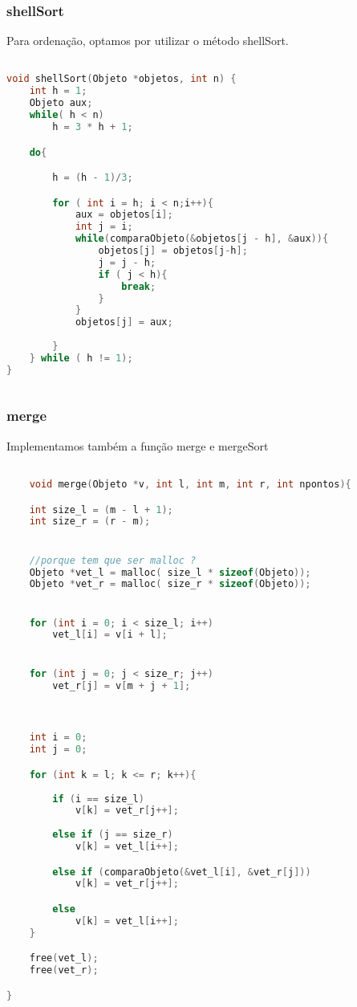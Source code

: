 \documentclass{article}
\begin{document}
\subsubsection{shellSort}

Para ordenação, optamos por utilizar o método shellSort.

\begin{lstlisting}[caption={Função shellSort},label={lst:cod7},language=C]

void shellSort(Objeto *objetos, int n) {
    int h = 1;
    Objeto aux;
    while( h < n)
        h = 3 * h + 1;

    do{

        h = (h - 1)/3;

        for ( int i = h; i < n;i++){
            aux = objetos[i]; 
            int j = i;
            while(comparaObjeto(&objetos[j - h], &aux)){
                objetos[j] = objetos[j-h];
                j = j - h;
                if ( j < h){
                    break;
                }
            }
            objetos[j] = aux;
            
        }
    } while ( h != 1); 
}
    
\end{lstlisting}

\subsubsection{merge}

Implementamos também a função merge e mergeSort

\begin{lstlisting}[caption={Função merge},label={lst:cod7},language=C]

    void merge(Objeto *v, int l, int m, int r, int npontos){

    int size_l = (m - l + 1);
    int size_r = (r - m);


    //porque tem que ser malloc ?
    Objeto *vet_l = malloc( size_l * sizeof(Objeto));
    Objeto *vet_r = malloc( size_r * sizeof(Objeto));


    for (int i = 0; i < size_l; i++)
        vet_l[i] = v[i + l];


    for (int j = 0; j < size_r; j++)
        vet_r[j] = v[m + j + 1];



    int i = 0; 
    int j = 0;

    for (int k = l; k <= r; k++){
         
        if (i == size_l)
            v[k] = vet_r[j++];
        
        else if (j == size_r)
            v[k] = vet_l[i++];

        else if (comparaObjeto(&vet_l[i], &vet_r[j]))
            v[k] = vet_r[j++];

        else
            v[k] = vet_l[i++];
    }

    free(vet_l);
    free(vet_r);

}
    
\end{lstlisting}
\end{document}

